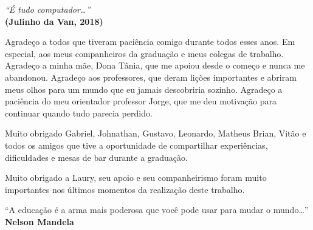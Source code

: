 




\newpage
\vspace*{\fill}
\begin{flushright}
    \textit{``É tudo computador\ldots''}\\
    \textbf{(Julinho da Van, 2018)}
\end{flushright}

\begin{agradecimentos}
  Agradeço a todos que tiveram paciência comigo durante todos esses anos. Em
  especial, aos meus companheiros da graduação e meus colegas de trabalho.
  Agradeço a minha mãe, Dona Tânia, que me apoiou desde o começo e nunca me
  abandonou. Agradeço aos professores, que deram lições importantes e abriram
  meus olhos para um mundo que eu jamais descobriria sozinho. Agradeço a
  paciência do meu orientador professor Jorge, que me deu motivação para
  continuar quando tudo parecia perdido.

  Muito obrigado Gabriel, Johnathan, Gustavo, Leonardo, Matheus Brian, Vitão e
  todos os amigos que tive a oportunidade de compartilhar experiências,
  dificuldades e mesas de bar durante a graduação.

  Muito obrigado a Laury, seu apoio e seu companheirismo foram muito importantes
  nos últimos momentos da realização deste trabalho.
\end{agradecimentos}

\begin{epigrafe}
  \vspace*{\fill}
  \begin{flushright}
    ``A educação é a arma mais poderosa que você pode usar para mudar o mundo\ldots''\\
    \vspace{\baselineskip}
    \textbf{Nelson Mandela}\\
  \end{flushright}
\end{epigrafe}



